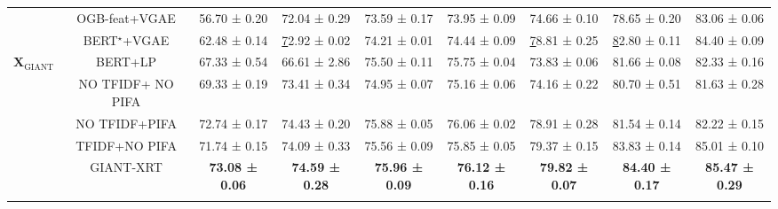 \documentclass{article} %
\begin{document}
\begin{table}[t!]
\begin{tabular}{@{}cccccc|ccc@{}}
 &
  OGB-feat+VGAE &
  56.70 ± 0.20 &
  72.04 ± 0.29 &
  73.59 ± 0.17 &
  73.95 ± 0.09 &
  74.66 ± 0.10 &
  78.65 ± 0.20 &
  83.06 ± 0.06 \\
 &
  BERT$^\star$+VGAE &
  62.48 ± 0.14 &
  {\ul 72.92 ± 0.02} &
  74.21 ± 0.01 &
  74.44 ± 0.09 &
  {\ul 78.81 ± 0.25} &
  {\ul 82.80 ± 0.11} &
  84.40 ± 0.09 \\ \midrule
\multicolumn{1}{l}{\multirow{5}{*}{$\mathbf{X}_{\text{GIANT}}$}} &
  BERT+LP &
  67.33 ± 0.54 &
  66.61 ± 2.86 &
  75.50 ± 0.11 &
  75.75 ± 0.04 &
  73.83 ± 0.06 &
  81.66 ± 0.08 &
  82.33 ± 0.16 \\ \cmidrule(l){2-9} 
\multicolumn{1}{l}{} &
  NO TFIDF+ NO PIFA &
  69.33 ± 0.19 &
  73.41 ± 0.34 &
  74.95 ± 0.07 &
  75.16 ± 0.06 &
  74.16 ± 0.22 &
  80.70 ± 0.51 &
  81.63 ± 0.28 \\
\multicolumn{1}{l}{} &
  NO TFIDF+PIFA &
  72.74 ± 0.17 &
  74.43 ± 0.20 &
  75.88 ± 0.05 &
  76.06 ± 0.02 &
  78.91 ± 0.28 &
  81.54 ± 0.14 &
  82.22 ± 0.15 \\
\multicolumn{1}{l}{} &
  TFIDF+NO PIFA &
  71.74 ± 0.15 &
  74.09 ± 0.33 &
  75.56 ± 0.09 &
  75.85 ± 0.05 &
  79.37 ± 0.15 &
  83.83 ± 0.14 &
  85.01 ± 0.10 \\
\multicolumn{1}{l}{} &
  GIANT-XRT &
  \textbf{73.08 ± 0.06} &
  \textbf{74.59 ± 0.28} &
  \textbf{75.96 ± 0.09} &
  \textbf{76.12 ± 0.16} &
  \textbf{79.82 ± 0.07} &
  \textbf{84.40 ± 0.17} &
  \textbf{85.47 ± 0.29} \\
  \bottomrule
  \vspace{-2em}
\end{tabular}

\end{table}
\end{document}
